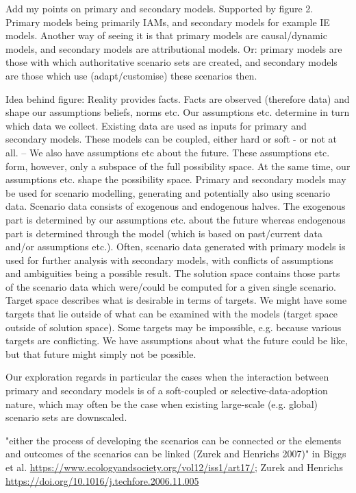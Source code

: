 \documentclass{article}
\begin{document}
\begin{refsection}
Add my points on primary and secondary models. Supported by figure 2. 
Primary models being primarily IAMs, and secondary models for example IE models. Another way of seeing it is that primary models are causal/dynamic models, and secondary models are attributional models. Or: primary models are those with which authoritative scenario sets are created, and secondary models are those which use (adapt/customise) these scenarios then.

Idea behind figure: 
Reality provides facts. 
Facts are observed (therefore data) and shape our assumptions beliefs, norms etc. 
Our assumptions etc. determine in turn which data we collect. 
Existing data are used as inputs for primary and secondary models. 
These models can be coupled, either hard or soft - or not at all. 
--
We also have assumptions etc about the future. 
These assumptions etc. form, however, only a subspace of the full possibility space. 
At the same time, our assumptions etc. shape the possibility space. 
Primary and secondary models may be used for scenario modelling, generating and potentially also using scenario data. 
Scenario data consists of exogenous and endogenous halves. The exogenous part is determined by our assumptions etc. about the future whereas endogenous part is determined through the model (which is based on past/current data and/or assumptions etc.). 
Often, scenario data generated with primary models is used for further analysis with secondary models, with conflicts of assumptions and ambiguities being a possible result. 
The solution space contains those parts of the scenario data which were/could be computed for a given single scenario. 
Target space describes what is desirable in terms of targets. 
We might have some targets that lie outside of what can be examined with the models (target space outside of solution space). 
Some targets may be impossible, e.g. because various targets are conflicting. 
We have assumptions about what the future could be like, but that future might simply not be possible.

Our exploration regards in particular the cases when the interaction between primary and secondary models is of a soft-coupled or selective-data-adoption nature, which may often be the case when existing large-scale (e.g. global) scenario sets are downscaled.

"either the process of developing the scenarios can be connected or the elements and outcomes of the scenarios can be linked (Zurek and Henrichs 2007)" in Biggs et al. \url{https://www.ecologyandsociety.org/vol12/iss1/art17/}; Zurek and Henrichs \url{https://doi.org/10.1016/j.techfore.2006.11.005}


\end{refsection}
\end{document}
